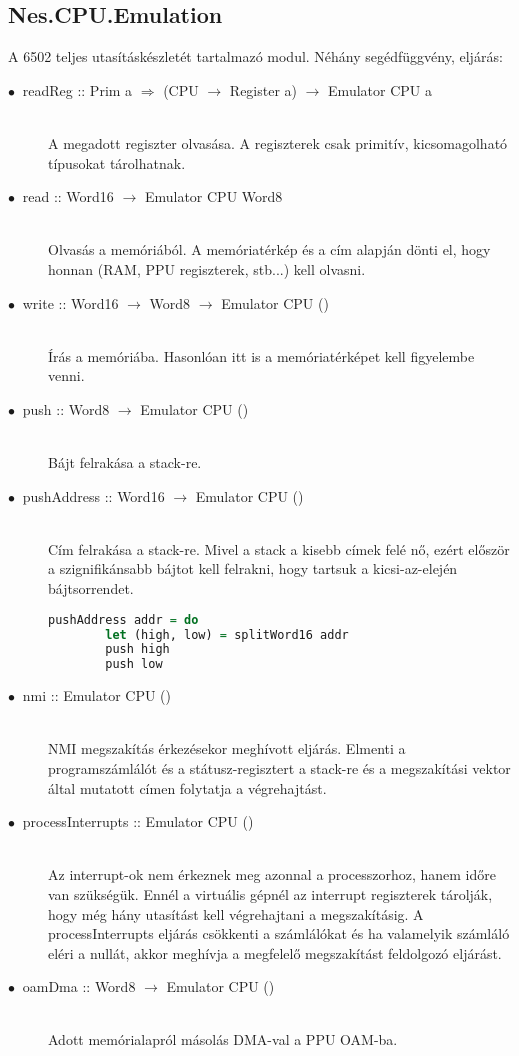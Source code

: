 \subsection{Nes.CPU.Emulation}
A 6502 teljes utasításkészletét tartalmazó modul. Néhány segédfüggvény, eljárás:

\begin{description}
	\item[$\bullet\:$ readReg :: Prim a $\Rightarrow$ (CPU $\rightarrow$ Register a) $\rightarrow$ Emulator CPU a] \hfill \\
	A megadott regiszter olvasása. A regiszterek csak primitív, kicsomagolható típusokat tárolhatnak.
	\item[$\bullet\:$ read :: Word16 $\rightarrow$ Emulator CPU Word8] \hfill \\
	Olvasás a memóriából. A memóriatérkép és a cím alapján dönti el, hogy honnan (RAM, PPU regiszterek, stb...) kell olvasni.
	\item[$\bullet\:$ write :: Word16 $\rightarrow$ Word8 $\rightarrow$ Emulator CPU ()] \hfill \\
	Írás a memóriába. Hasonlóan itt is a memóriatérképet kell figyelembe venni.
	\item[$\bullet\:$ push :: Word8 $\rightarrow$ Emulator CPU ()] \hfill \\
	Bájt felrakása a stack-re.
	\item[$\bullet\:$ pushAddress :: Word16 $\rightarrow$ Emulator CPU ()] \hfill \\
	Cím felrakása a stack-re. Mivel a stack a kisebb címek felé nő, ezért először a szignifikánsabb bájtot kell felrakni, hogy tartsuk a kicsi-az-elején bájtsorrendet.
	\begin{lstlisting}[language=Haskell]
	pushAddress addr = do
		let (high, low) = splitWord16 addr 
		push high
		push low
	\end{lstlisting}
	\item[$\bullet\:$ nmi :: Emulator CPU ()] \hfill \\
	NMI megszakítás érkezésekor meghívott eljárás. Elmenti a programszámlálót és a státusz-regisztert a stack-re és a megszakítási vektor által mutatott címen folytatja a végrehajtást.
	\item[$\bullet\:$ processInterrupts :: Emulator CPU ()] \hfill \\
	Az interrupt-ok nem érkeznek meg azonnal a processzorhoz, hanem időre van szükségük.
	Ennél a virtuális gépnél az interrupt regiszterek tárolják, hogy még hány utasítást kell végrehajtani a megszakításig. A processInterrupts eljárás csökkenti a számlálókat és ha valamelyik számláló eléri a nullát, akkor meghívja a megfelelő megszakítást feldolgozó eljárást. 
	\item[$\bullet\:$ oamDma :: Word8 $\rightarrow$ Emulator CPU ()] \hfill \\
	Adott memórialapról másolás DMA-val a PPU OAM-ba.
\end{description}


